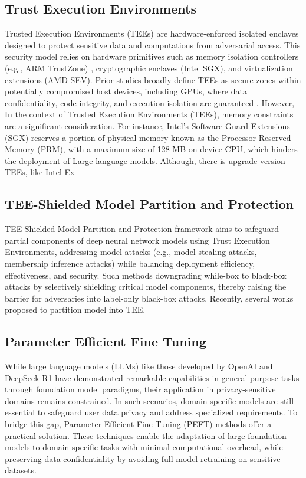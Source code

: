 \documentclass{article}
\begin{document}
\subsection{Trust Execution Environments}
Trusted Execution Environments (TEEs) are hardware-enforced isolated enclaves designed to protect sensitive data and computations from adversarial access. This security model relies on hardware primitives such as memory isolation controllers (e.g., ARM TrustZone\cite{alves2004trustzone}) 
, cryptographic enclaves (Intel SGX\cite{costan2016intel}), and virtualization extensions (AMD SEV\cite{kaplan2016amd}). Prior studies \cite{zhang2024no,hou2021model}broadly define TEEs as secure zones within potentially compromised host devices, including GPUs, where data confidentiality, code integrity, and execution isolation are guaranteed 
. However, In the context of Trusted Execution Environments (TEEs), memory constraints are a significant consideration. For instance, Intel's Software Guard Extensions (SGX) reserves a portion of physical memory known as the Processor Reserved Memory (PRM), with a maximum size of 128 MB on device CPU, which hinders the deployment of Large language models. Although, there is upgrade version TEEs, like Intel Ex

\subsection{TEE-Shielded Model Partition and Protection}
TEE-Shielded Model Partition and Protection framework aims to safeguard partial components of deep neural network models using Trust Execution Environments, addressing model attacks (e.g., model stealing attacks, membership inference attacks) while balancing deployment efficiency, effectiveness, and security. Such methods downgrading while-box to black-box attacks by selectively shielding critical model components, thereby raising the barrier for adversaries into label-only black-box attacks. Recently, several works proposed to partition model into TEE.

\subsection{Parameter Efficient Fine Tuning}
While large language models (LLMs) like those developed by OpenAI and DeepSeek-R1 have demonstrated remarkable capabilities in general-purpose tasks through foundation model paradigms, their application in privacy-sensitive domains remains constrained. In such scenarios, domain-specific models are still essential to safeguard user data privacy and address specialized requirements. To bridge this gap, Parameter-Efficient Fine-Tuning (PEFT) methods offer a practical solution. These techniques enable the adaptation of large foundation models to domain-specific tasks with minimal computational overhead, while preserving data confidentiality by avoiding full model retraining on sensitive datasets.
\end{document}
